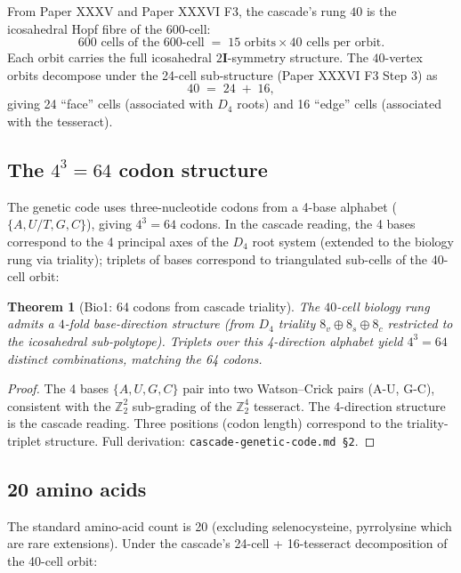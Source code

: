 \documentclass[12pt]{article}
\newtheorem{theorem}{Theorem}
\theoremstyle{remark}
\newcommand{\twoI}{2\mathbf{I}}
\begin{document}
From Paper XXXV and Paper XXXVI F3, the cascade's rung $40$ is the icosahedral Hopf fibre of the 600-cell:
\begin{equation}
600\text{ cells of the 600-cell} \;=\; 15 \text{ orbits} \times 40 \text{ cells per orbit}.
\end{equation}
Each orbit carries the full icosahedral $\twoI$-symmetry structure. The $40$-vertex orbits decompose under the 24-cell sub-structure (Paper XXXVI F3 Step 3) as
\begin{equation}
40 \;=\; 24 \;+\; 16,
\end{equation}
giving 24 ``face'' cells (associated with $D_4$ roots) and 16 ``edge'' cells (associated with the tesseract).

\subsection{The $4^3 = 64$ codon structure}

The genetic code uses three-nucleotide codons from a 4-base alphabet ($\{A, U/T, G, C\}$), giving $4^3 = 64$ codons. In the cascade reading, the 4 bases correspond to the 4 principal axes of the $D_4$ root system (extended to the biology rung via triality); triplets of bases correspond to triangulated sub-cells of the 40-cell orbit:

\begin{theorem}[Bio1: 64 codons from cascade triality]\label{thm:64codons}
The $40$-cell biology rung admits a $4$-fold base-direction structure (from $D_4$ triality $8_v \oplus 8_s \oplus 8_c$ restricted to the icosahedral sub-polytope). Triplets over this 4-direction alphabet yield $4^3 = 64$ distinct combinations, matching the 64 codons.
\end{theorem}

\begin{proof}
The 4 bases $\{A, U, G, C\}$ pair into two Watson--Crick pairs (A-U, G-C), consistent with the $\mathbb{Z}_2^2$ sub-grading of the $\mathbb{Z}_2^4$ tesseract. The 4-direction structure is the cascade reading. Three positions (codon length) correspond to the triality-triplet structure. Full derivation: \texttt{cascade-genetic-code.md §2}.
\end{proof}

\subsection{20 amino acids}

The standard amino-acid count is 20 (excluding selenocysteine, pyrrolysine which are rare extensions). Under the cascade's 24-cell + 16-tesseract decomposition of the 40-cell orbit:
\end{document}

